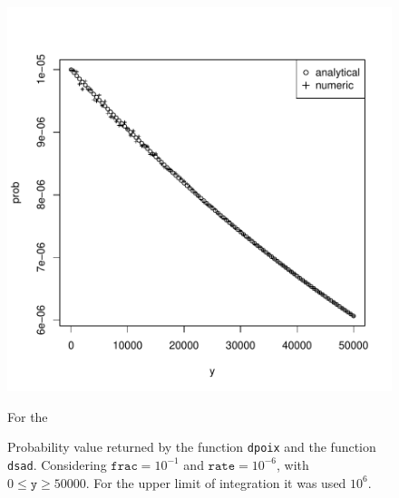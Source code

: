 \documentclass{article}
\newcommand{\code}[1]{\texttt{#1}}
\begin{document}
\begin{figure}[ht]
  \begin{center}
\includegraphics{sads_tutorial-016}
\end{center}
\caption{Probability value returned by the function \code{dpoix} and the function \code{dsad}. Considering $\code{frac}=10^{-1}$ and $\code{rate}=10^{-6}$, with $0 \leq \code{y} \geq 50000$. For the upper limit of integration it was used $10^{6}$.}
\label{fig:GLIntegrate} For the 
\end{figure}
\end{document}
